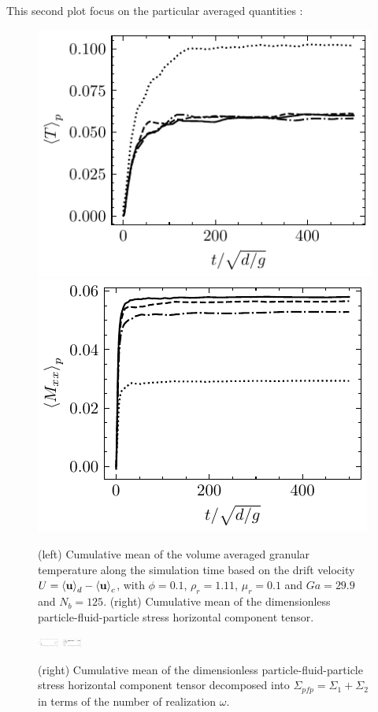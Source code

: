 This second plot focus on the particular averaged quantities : 
\begin{figure}[h!]
    \centering
    \includegraphics[height = 0.3\textwidth]{image/VALIDATION2.0/fPA/Tcum.pdf}
    \includegraphics[height = 0.3\textwidth]{image/VALIDATION2.0/fPA/Scum.pdf}
    \caption{(left) Cumulative mean of the volume averaged granular temperature along the simulation time based on the drift velocity $U = \left<\textbf{u}\right>_d - \left<\textbf{u}\right>_c$, with $\phi = 0.1$, $\rho_r = 1.11$, $ \mu_r =0.1$ and $Ga = 29.9$ and $N_b = 125$.
    (right) Cumulative mean of the dimensionless particle-fluid-particle stress horizontal component tensor. }
\end{figure}
\begin{figure}[h!]
    \centering
    \includegraphics[height = 0.3cm]{image/VALIDATION2.0/fPA/PFPxx_x3.pdf}
    \includegraphics[height = 0.3cm]{image/VALIDATION2.0/fPA/PFPyy_x3.pdf}
    \caption{
    (right) Cumulative mean of the dimensionless particle-fluid-particle stress horizontal component tensor decomposed into $\Sigma_{pfp}= \Sigma_1+\Sigma_2$ in terms of the number of realization $\omega$. }
\end{figure}
